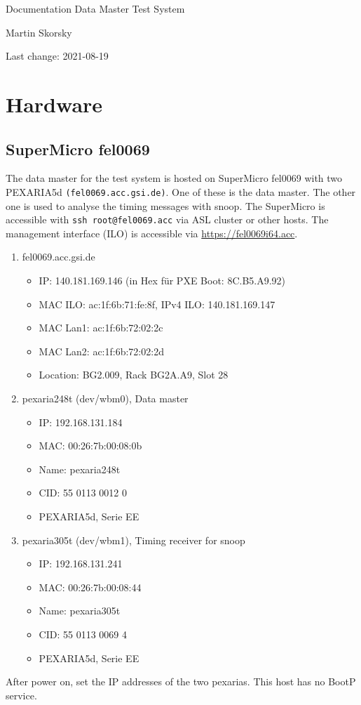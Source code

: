\documentclass[12pt,a4paper]{report}
\begin{document}
\begin{titlepage}
\vspace{2cm}
\begin{center}
\Huge{Documentation Data Master Test System}

\Large{Martin Skorsky}

\Large{Last change: 2021-08-19}
\end{center}
\vfill
\end{titlepage}

\tableofcontents

\chapter{Hardware}
\section{SuperMicro fel0069}
The data master for the test system is hosted on SuperMicro fel0069 with two PEXARIA5d \texttt{(fel0069.acc.gsi.de)}.
One of these is the data master. The other one is used to analyse the timing messages with snoop.
The SuperMicro is accessible with \texttt{ssh root@fel0069.acc} via ASL cluster or other hosts.
The management interface (ILO) is accessible via \url{https://fel0069i64.acc}.
\begin{enumerate}
\item fel0069.acc.gsi.de
\begin{itemize}
\item IP: 140.181.169.146 (in Hex für PXE Boot: 8C.B5.A9.92)
\item MAC ILO: ac:1f:6b:71:fe:8f, IPv4 ILO: 140.181.169.147
\item MAC Lan1: ac:1f:6b:72:02:2c
\item MAC Lan2: ac:1f:6b:72:02:2d
\item Location: BG2.009, Rack BG2A.A9, Slot 28
\end{itemize}
\item pexaria248t (dev/wbm0), Data master
\begin{itemize}
\item IP: 192.168.131.184
\item MAC: 00:26:7b:00:08:0b
\item Name: pexaria248t
\item CID: 55 0113 0012 0
\item PEXARIA5d, Serie EE
\end{itemize}
\item pexaria305t (dev/wbm1), Timing receiver for snoop
\begin{itemize}
\item IP: 192.168.131.241
\item MAC: 00:26:7b:00:08:44
\item Name: pexaria305t
\item CID: 55 0113 0069 4
\item PEXARIA5d, Serie EE
\end{itemize}
\end{enumerate}
After power on, set the IP addresses of the two pexarias. This host has no BootP service.
\end{document}
